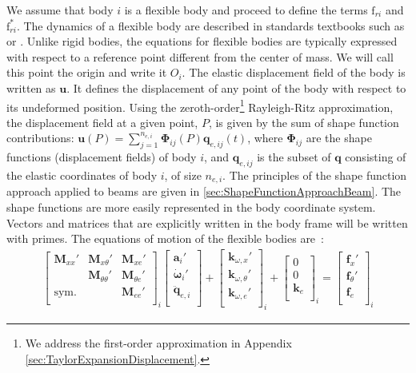 \documentclass[wes, manuscript]{copernicus}
\renewcommand{\v}[1]{\boldsymbol{#1}}
\newcommand{\m}[1]{\boldsymbol{#1}}
\newcommand{\M} {{\m{M}}}
\newcommand{\kanef}{\mathrm{f}}
\begin{document}
We assume that body $i$ is a flexible body and proceed to define the terms $\kanef_{ri}$ and $\kanef_{ri}^*$.
The dynamics of a flexible body are described in standards textbooks 
such as \cite{shabana:book} or \cite{Schwertassek:book}.
Unlike rigid bodies, the equations for flexible bodies are typically expressed with respect to a reference point different from the center of mass.
We will call this point the origin and write it $O_i$.
The elastic displacement field of the body is written as $\v{u}$.
It defines the displacement of any point of the body with respect to its undeformed position.
Using the zeroth-order\footnote{We address the first-order approximation in Appendix \ref{sec:TaylorExpansionDisplacement}.} Rayleigh-Ritz approximation, the displacement field at a given point, $P$, is given by the sum of shape function contributions: $\v{u}(P)=\sum_{j=1}^{n_{e,i}} \v{\Phi}_{ij}(P) \v{q}_{e,ij}(t)$, where $\m{\Phi}_{ij}$ are the shape functions (displacement fields) of body $i$, and $\v{q}_{e,ij}$ is the subset of $\v{q}$ consisting of the elastic coordinates of body $i$, of size $n_{e,i}$.
The principles of the shape function approach applied to beams are given in \autoref{sec:ShapeFunctionApproachBeam}.
The shape functions are more easily represented in the body coordinate system.  
Vectors and matrices that are explicitly written in the body frame will be written with primes.
The equations of motion of the flexible bodies are~\citep{Wallrapp:1994}:
\begin{align}
    \begin{bmatrix}
       \M_{xx}'    & \M_{x \theta}' & \M_{ x e }' \\
                   & \M_{\theta \theta}'   & \M_{\theta e}'   \\
       \text{sym.} &            & \M_{e e}'  \\
    \end{bmatrix}_i
    \begin{bmatrix}
      \v{a}_i' \\
      \v{\dot{\omega}}_i' \\
      \v{\ddot{q}}_{e,i} \\
    \end{bmatrix}
      +
    \begin{bmatrix}
      \v{k}_{\omega, x}' \\
      \v{k}_{\omega, \theta}' \\
      \v{k}_{\omega, e}' \\
    \end{bmatrix}_i
      +
    \begin{bmatrix}
      0 \\
      0 \\
      \v{k}_{e}\\
    \end{bmatrix}_i
      =
    \begin{bmatrix}
      \v{f}_{x}' \\
      \v{f}_{\theta}' \\
      \v{f}_{e}\\
    \end{bmatrix}_i
    \label{eq:EOMFlexibleBody}
\end{align}
\end{document}
